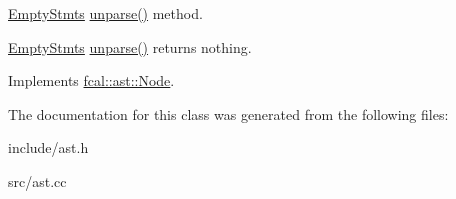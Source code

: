 \hyperlink{classfcal_1_1ast_1_1EmptyStmts}{Empty\+Stmts} \hyperlink{classfcal_1_1ast_1_1EmptyStmts_abbccd9fb3e02082962774479fc47116d}{unparse()} method. 

\hyperlink{classfcal_1_1ast_1_1EmptyStmts}{Empty\+Stmts} \hyperlink{classfcal_1_1ast_1_1EmptyStmts_abbccd9fb3e02082962774479fc47116d}{unparse()} returns nothing. 

Implements \hyperlink{classfcal_1_1ast_1_1Node_a81865f5a1df593708a39bf492952742a}{fcal\+::ast\+::\+Node}.



The documentation for this class was generated from the following files\+:\begin{DoxyCompactItemize}
\item 
include/ast.\+h\item 
src/ast.\+cc\end{DoxyCompactItemize}
